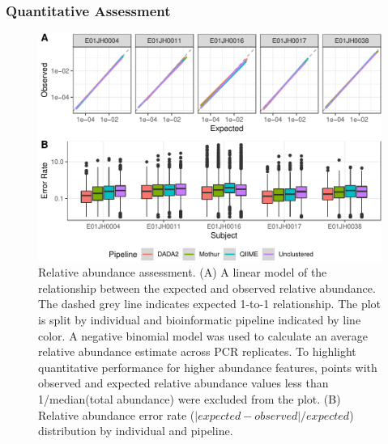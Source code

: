 \documentclass[linenumbers]{bmcart}
\begin{document}
\subsubsection*{Quantitative Assessment}

\begin{figure}
\centering
\includegraphics{relAbuError-1.pdf}
\caption{\label{fig:relAbuError}Relative abundance assessment. (A) A linear model of the relationship between the expected and observed relative
abundance. The dashed grey line indicates expected 1-to-1 relationship.
The plot is split by individual and bioinformatic pipeline indicated by line color. A negative binomial model was used to
calculate an average relative abundance estimate across PCR
replicates. To highlight quantitative performance for higher abundance features, points with observed and expected relative abundance values less than 1/median(total abundance) were excluded from the plot.
(B) Relative abundance error rate (\(|expected - observed|/expected\)) distribution by individual and pipeline.}
\end{figure}
\end{document}
